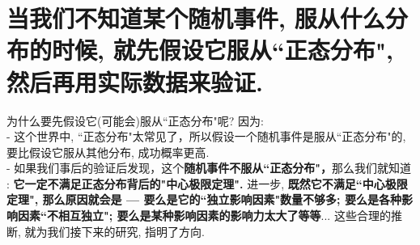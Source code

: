 \documentclass[UTF8]{ctexart}
\begin{document}
	
	
	
	
	\section{当我们不知道某个随机事件, 服从什么分布的时候, 就先假设它服从``正态分布", 然后再用实际数据来验证.}
	
	为什么要先假设它(可能会)服从``正态分布"呢? 因为: \\
	- 这个世界中, ``正态分布"太常见了，所以假设一个随机事件是服从``正态分布"的, 要比假设它服从其他分布, 成功概率更高. \\
	- 如果我们事后的验证后发现，这个\textbf{随机事件不服从``正态分布"，}那么我们就知道 : \textbf{它一定不满足正态分布背后的"中心极限定理".} 进一步, \textbf{既然它不满足``中心极限定理", 那么原因就会是 --- 要么是它的``独立影响因素"数量不够多; 要么是各种影响因素``不相互独立"; 要么是某种影响因素的影响力太大了等等}... 这些合理的推断, 就为我们接下来的研究, 指明了方向. \\
	
	
	
	
	
	
	
	
	
	
	
	
\end{document}
